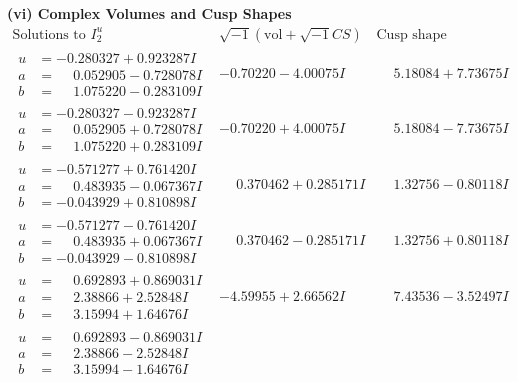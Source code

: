 \documentclass[1p]{elsarticle_modified}
\theoremstyle{definition}
\newcommand{\I}{\sqrt{-1}}
\begin{document}
\newpage\flushleft \textbf{(vi) Complex Volumes and Cusp Shapes}
$$\begin{array}{c|c|c}  
\text{Solutions to }I^u_{2}& \I (\text{vol} + \sqrt{-1}CS) & \text{Cusp shape}\\
 \hline 
\begin{aligned}
u &= -0.280327 + 0.923287 I \\
a &= \phantom{-}0.052905 - 0.728078 I \\
b &= \phantom{-}1.075220 - 0.283109 I\end{aligned}
 & -0.70220 - 4.00075 I & \phantom{-}5.18084 + 7.73675 I \\ \hline\begin{aligned}
u &= -0.280327 - 0.923287 I \\
a &= \phantom{-}0.052905 + 0.728078 I \\
b &= \phantom{-}1.075220 + 0.283109 I\end{aligned}
 & -0.70220 + 4.00075 I & \phantom{-}5.18084 - 7.73675 I \\ \hline\begin{aligned}
u &= -0.571277 + 0.761420 I \\
a &= \phantom{-}0.483935 - 0.067367 I \\
b &= -0.043929 + 0.810898 I\end{aligned}
 & \phantom{-}0.370462 + 0.285171 I & \phantom{-}1.32756 - 0.80118 I \\ \hline\begin{aligned}
u &= -0.571277 - 0.761420 I \\
a &= \phantom{-}0.483935 + 0.067367 I \\
b &= -0.043929 - 0.810898 I\end{aligned}
 & \phantom{-}0.370462 - 0.285171 I & \phantom{-}1.32756 + 0.80118 I \\ \hline\begin{aligned}
u &= \phantom{-}0.692893 + 0.869031 I \\
a &= \phantom{-}2.38866 + 2.52848 I \\
b &= \phantom{-}3.15994 + 1.64676 I\end{aligned}
 & -4.59955 + 2.66562 I & \phantom{-}7.43536 - 3.52497 I \\ \hline\begin{aligned}
u &= \phantom{-}0.692893 - 0.869031 I \\
a &= \phantom{-}2.38866 - 2.52848 I \\
b &= \phantom{-}3.15994 - 1.64676 I\end{aligned}

\end{array}$$
\end{document}
